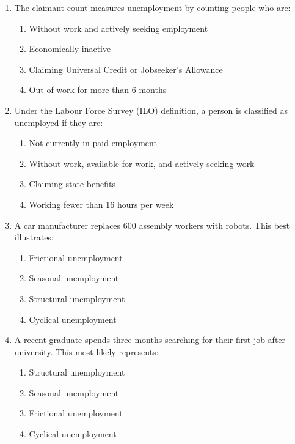 \documentclass[12pt,a4paper]{article}
\begin{document}
\begin{enumerate}[leftmargin=*, label=\textbf{\arabic*.}]

    \item The claimant count measures unemployment by counting people who are:
    \begin{enumerate}[label=(\Alph*), topsep=2pt]
        \item Without work and actively seeking employment
        \item Economically inactive
        \item Claiming Universal Credit or Jobseeker's Allowance
        \item Out of work for more than 6 months
    \end{enumerate}

    \vspace{0.4em}

    \item Under the Labour Force Survey (ILO) definition, a person is classified as unemployed if they are:
    \begin{enumerate}[label=(\Alph*), topsep=2pt]
        \item Not currently in paid employment
        \item Without work, available for work, and actively seeking work
        \item Claiming state benefits
        \item Working fewer than 16 hours per week
    \end{enumerate}

    \vspace{0.4em}

    \item A car manufacturer replaces 600 assembly workers with robots. This best illustrates:
    \begin{enumerate}[label=(\Alph*), topsep=2pt]
        \item Frictional unemployment
        \item Seasonal unemployment
        \item Structural unemployment
        \item Cyclical unemployment
    \end{enumerate}

    \vspace{0.4em}

    \item A recent graduate spends three months searching for their first job after university. This most likely represents:
    \begin{enumerate}[label=(\Alph*), topsep=2pt]
        \item Structural unemployment
        \item Seasonal unemployment
        \item Frictional unemployment
        \item Cyclical unemployment
    \end{enumerate}


\end{enumerate}
\end{document}
